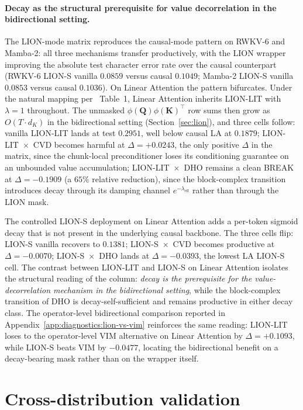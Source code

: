 \paragraph{Decay as the structural prerequisite for value
decorrelation in the bidirectional setting.} The LION-mode
matrix reproduces the causal-mode pattern on RWKV-6 and
Mamba-2: all three mechanisms transfer productively, with the
LION wrapper improving the absolute test character error rate
over the causal counterpart (RWKV-6 LION-S vanilla $0.0859$
versus causal $0.1049$; Mamba-2 LION-S vanilla $0.0853$ versus
causal $0.1036$). On Linear Attention the pattern bifurcates.
Under the natural mapping per~\citet{afzal2025linear} Table~1,
Linear Attention inherits LION-LIT with $\lambda = 1$
throughout. The unmasked
$\phi(\mathbf{Q}) \phi(\mathbf{K})^{\top}$ row sums then grow
as $O(T \cdot d_{K})$ in the bidirectional setting
(Section~\ref{sec:lion}), and three cells follow: vanilla
LION-LIT lands at test $0.2951$, well below causal LA at
$0.1879$; LION-LIT~$\times$~CVD becomes harmful at
$\Delta = +0.0243$, the only positive $\Delta$ in the matrix,
since the chunk-local preconditioner loses its conditioning
guarantee on an unbounded value accumulation;
LION-LIT~$\times$~DHO remains a clean BREAK at
$\Delta = -0.1909$ (a $65\%$ relative reduction), since the
block-complex transition introduces decay through its damping
channel $e^{-\lambda_{\mathrm{eff}}}$ rather than through the
LION mask.

The controlled LION-S deployment on Linear Attention adds a
per-token sigmoid decay that is not present in the underlying
causal backbone. The three cells flip: LION-S vanilla recovers
to $0.1381$; LION-S~$\times$~CVD becomes productive at
$\Delta = -0.0070$; LION-S~$\times$~DHO lands at
$\Delta = -0.0393$, the lowest LA LION-S cell. The contrast
between LION-LIT and LION-S on Linear Attention isolates the
structural reading of the column: \textit{decay is the
prerequisite for the value-decorrelation mechanism in the
bidirectional setting}, while the block-complex transition of
DHO is decay-self-sufficient and remains productive in either
decay class. The operator-level bidirectional comparison
reported in Appendix~\ref{app:diagnostics:lion-vs-vim}
reinforces the same reading: LION-LIT loses to the
operator-level VIM alternative on Linear Attention by
$\Delta = +0.1093$, while LION-S beats VIM by $-0.0477$,
locating the bidirectional benefit on a decay-bearing mask
rather than on the wrapper itself.

\section{Cross-distribution validation}\label{sec:experiments:cv}

